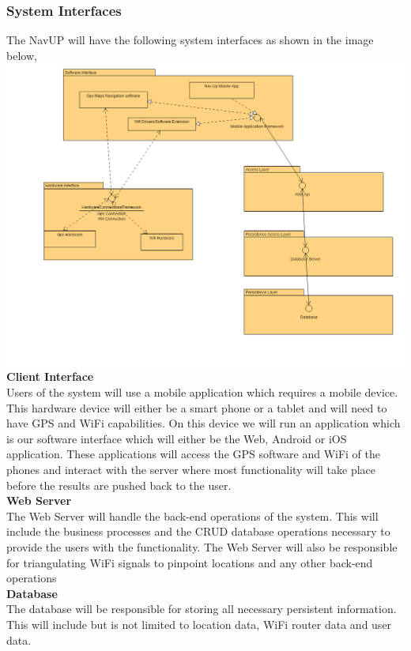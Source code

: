 \documentclass[a4paper,12pt]{article}
\begin{document}
\subsubsection{System Interfaces}
The NavUP will have the following system interfaces as shown in the image below,\\
\includegraphics[width=\textwidth]{images/system_interface.png}
\textbf {Client Interface}\\
Users of the system will use a mobile application which requires a mobile device. This hardware device will either be a smart phone or a tablet and will need to have GPS and WiFi capabilities. On this device we will run an application which is our software interface which will either be the Web, Android or iOS application. These applications will access the GPS software and WiFi of the phones and interact with the server where most functionality will take place before the results are pushed back to the user.\\
\textbf{Web Server}\\
The Web Server will handle the back-end operations of the system. This will include the business processes and the CRUD database operations necessary to provide the users with the functionality. The Web Server will also be responsible for triangulating WiFi signals to pinpoint locations and any other  back-end operations \\
\textbf{Database}\\
The database will be responsible for storing all necessary persistent information. This will include but is not limited to location data, WiFi router data and user data.
\end{document}
